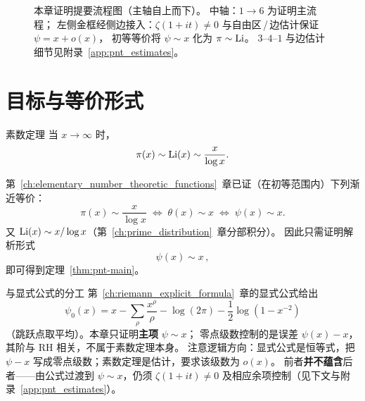 \begin{figure}[htbp]
\caption{本章证明提要流程图（主轴自上而下）。
中轴：$1\to 6$ 为证明主流程；
左侧金框经侧边接入：$\zeta(1+it)\neq 0$ 与自由区\,/\,边估计保证 $\psi=x+o(x)$，
初等等价将 $\psi\sim x$ 化为 $\pi\sim\operatorname{Li}$。
$3$--$4$--$1$ 与边估计细节见附录~\ref{app:pnt_estimates}。}
\label{fig:pnt-flow}
\end{figure}

\section{目标与等价形式}\label{sec:pnt_goal}

\begin{theorem}{素数定理}{}
\label{thm:pnt-main}
当 $x\to\infty$ 时，
\[
  \pi(x)\sim\operatorname{Li}(x)\sim\frac{x}{\log x}.
\]
\end{theorem}

第~\ref{ch:elementary_number_theoretic_functions}~章已证（在初等范围内）下列渐近等价：
\begin{equation}
  \pi(x)\sim\frac{x}{\log x}
  \;\Longleftrightarrow\;
  \theta(x)\sim x
  \;\Longleftrightarrow\;
  \psi(x)\sim x.
  \label{eq:pnt-equiv-ch11}
\end{equation}
又 $\operatorname{Li}(x)\sim x/\log x$（第~\ref{ch:prime_distribution}~章分部积分）。
因此只需证明解析形式
\begin{equation}
  \boxed{\psi(x)\sim x}\,,
  \label{eq:psi-sim-x}
\end{equation}
即可得到定理~\ref{thm:pnt-main}。

\begin{remark}{与显式公式的分工}{}
第~\ref{ch:riemann_explicit_formula}~章的显式公式给出
\[
  \psi_0(x)=x-\sum_{\rho}\frac{x^{\rho}}{\rho}-\log(2\pi)-\frac12\log(1-x^{-2})
\]
（跳跃点取平均）。本章只证明\textbf{主项} $\psi\sim x$；
零点级数控制的是误差 $\psi(x)-x$，其阶与 RH 相关，不属于素数定理本身。
注意逻辑方向：显式公式是恒等式，把 $\psi-x$ 写成零点级数；素数定理是估计，要求该级数为 $o(x)$。
前者\textbf{并不蕴含}后者——由公式过渡到 $\psi\sim x$，仍须 $\zeta(1+it)\neq 0$ 及相应余项控制（见下文与附录~\ref{app:pnt_estimates}）。
\end{remark}

